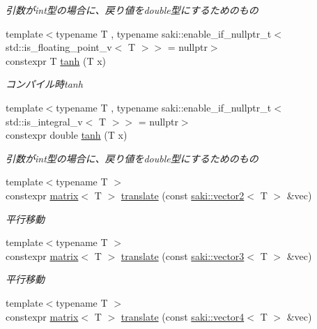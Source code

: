 \begin{DoxyCompactItemize}
\begin{DoxyCompactList}\small\item\em 引数がint型の場合に、戻り値をdouble型にするためのもの \end{DoxyCompactList}\item 
{\footnotesize template$<$typename T , typename saki\+::enable\+\_\+if\+\_\+nullptr\+\_\+t$<$ std\+::is\+\_\+floating\+\_\+point\+\_\+v$<$ T $>$$>$  = nullptr$>$ }\\constexpr T \mbox{\hyperlink{namespacesaki_af2674216630169ce211f8076492ce14e}{tanh}} (T x)
\begin{DoxyCompactList}\small\item\em コンパイル時tanh \end{DoxyCompactList}\item 
{\footnotesize template$<$typename T , typename saki\+::enable\+\_\+if\+\_\+nullptr\+\_\+t$<$ std\+::is\+\_\+integral\+\_\+v$<$ T $>$$>$  = nullptr$>$ }\\constexpr double \mbox{\hyperlink{namespacesaki_a5faf83bc9a4a7e981275deba551d2f3f}{tanh}} (T x)
\begin{DoxyCompactList}\small\item\em 引数がint型の場合に、戻り値をdouble型にするためのもの \end{DoxyCompactList}\item 
{\footnotesize template$<$typename T $>$ }\\constexpr \mbox{\hyperlink{classsaki_1_1matrix}{matrix}}$<$ T $>$ \mbox{\hyperlink{namespacesaki_a2311e77a2bed9d914a6b3e8056d6023a}{translate}} (const \mbox{\hyperlink{classsaki_1_1vector2}{saki\+::vector2}}$<$ T $>$ \&vec)
\begin{DoxyCompactList}\small\item\em 平行移動 \end{DoxyCompactList}\item 
{\footnotesize template$<$typename T $>$ }\\constexpr \mbox{\hyperlink{classsaki_1_1matrix}{matrix}}$<$ T $>$ \mbox{\hyperlink{namespacesaki_a492418470fa4dedb2065e7916460f0e0}{translate}} (const \mbox{\hyperlink{classsaki_1_1vector3}{saki\+::vector3}}$<$ T $>$ \&vec)
\begin{DoxyCompactList}\small\item\em 平行移動 \end{DoxyCompactList}\item 
{\footnotesize template$<$typename T $>$ }\\constexpr \mbox{\hyperlink{classsaki_1_1matrix}{matrix}}$<$ T $>$ \mbox{\hyperlink{namespacesaki_abdd23c2e56d1500ae2e8b662c5ddcf7c}{translate}} (const \mbox{\hyperlink{classsaki_1_1vector4}{saki\+::vector4}}$<$ T $>$ \&vec)

\end{DoxyCompactItemize}
